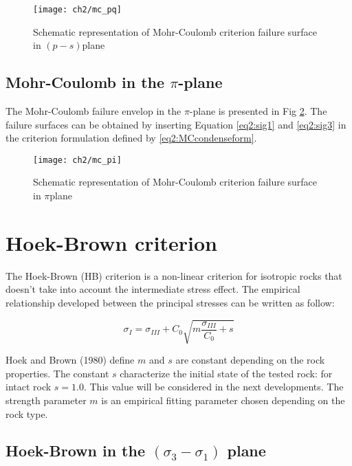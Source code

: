 \begin{figure}[tb]
    \centering
    \texttt{[image: ch2/mc\_pq]}
    \caption{Schematic representation of Mohr-Coulomb criterion failure surface in  $(p-s)$plane}
    \label{fig2:mc_pq}
\end{figure} 

\subsection{Mohr-Coulomb in the \texorpdfstring{$\pi$}{pi}-plane}\label{ch2:MC_pi}

The Mohr-Coulomb failure envelop in the $\pi$-plane is presented in Fig \ref{fig2:mc_pi}. The failure surfaces can be obtained by inserting Equation \ref{eq2:sig1} and \ref{eq2:sig3} in the criterion formulation defined by \ref{eq2:MCcondenseform}. 

\begin{figure}[tb]
    \centering
    \texttt{[image: ch2/mc\_pi]}
    \caption{Schematic representation of Mohr-Coulomb criterion failure surface in  $\pi$plane}
    \label{fig2:mc_pi}
\end{figure} 

\section{Hoek-Brown criterion}

The Hoek-Brown (HB) criterion is a non-linear criterion for isotropic rocks that doesn’t take into account the intermediate stress effect. The empirical relationship developed between the principal stresses can be written as follow:

\begin{equation}\label{eq2:HB-crit}
    \sigma_{I}=\sigma_{I I I}+C_{0} \sqrt{m \frac{\sigma_{I I I}}{C_{0}}+s}
\end{equation}

Hoek and Brown (1980) \cite{Hoek1980} define $m$ and $s$  are constant depending on the rock properties. The constant $s$ characterize the initial state of the tested rock: for intact rock $s=1.0$. This value will be considered in the next developments. The strength parameter $m$ is an empirical fitting parameter chosen depending on the rock type. 

\subsection{Hoek-Brown in the \texorpdfstring{$(\sigma_3 -\sigma_1)$}{sigma 3 - sigma 1} plane}

